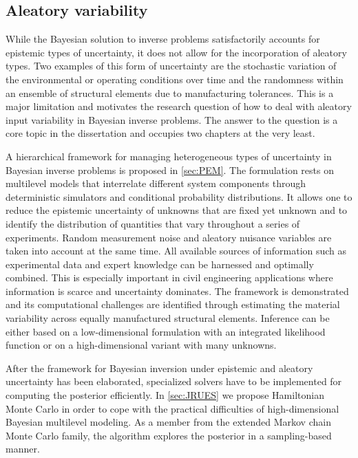 \begin{refsection}
\subsection{Aleatory variability}
While the Bayesian solution to inverse problems satisfactorily accounts for epistemic types of uncertainty, it does not allow for the incorporation of aleatory types.
Two examples of this form of uncertainty are the stochastic variation of the environmental or operating conditions over time
and the randomness within an ensemble of structural elements due to manufacturing tolerances.
This is a major limitation and motivates the research question of how to deal with aleatory input variability in Bayesian inverse problems.
The answer to the question is a core topic in the dissertation and occupies two chapters at the very least.
\par %
A hierarchical framework for managing heterogeneous types of uncertainty in Bayesian inverse problems is proposed in \cref{sec:PEM}.
The formulation rests on multilevel models that interrelate different system components through deterministic simulators and conditional probability distributions.
It allows one to reduce the epistemic uncertainty of unknowns that are fixed yet unknown and to identify the distribution of quantities that vary throughout a series of experiments.
Random measurement noise and aleatory nuisance variables are taken into account at the same time.
All available sources of information such as experimental data and expert knowledge can be harnessed and optimally combined.
This is especially important in civil engineering applications where information is scarce and uncertainty dominates.
The framework is demonstrated and its computational challenges are identified through estimating the material variability across equally manufactured structural elements.
Inference can be either based on a low-dimensional formulation with an integrated likelihood function or on a high-dimensional variant with many unknowns.
\par %
After the framework for Bayesian inversion under epistemic and aleatory uncertainty has been elaborated, specialized solvers have to be implemented for computing the posterior efficiently.
In \cref{sec:JRUES} we propose Hamiltonian Monte Carlo in order to cope with the practical difficulties of high-dimensional Bayesian multilevel modeling.
As a member from the extended Markov chain Monte Carlo family, the algorithm explores the posterior in a sampling-based manner.

\end{refsection}

